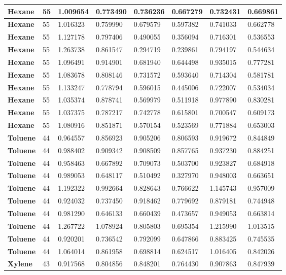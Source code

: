\documentclass{amsart}
\begin{document}
\begin{center}
\begin{tabular}{|l|l|l|l|l|l|l|l|}
\textbf{Hexane}& 55&1.009654&0.773490&0.736236&0.667279&0.732431&0.669861 \\ \hline 
\textbf{Hexane}& 55&1.016323&0.759990&0.679579&0.597382&0.741033&0.662778 \\ \hline 
\textbf{Hexane}& 55&1.127178&0.797406&0.490055&0.356094&0.716301&0.536553 \\ \hline 
\textbf{Hexane}& 55&1.263738&0.861547&0.294719&0.239861&0.794197&0.544634 \\ \hline 
\textbf{Hexane}& 55&1.096491&0.914901&0.681940&0.644498&0.935015&0.777281 \\ \hline 
\textbf{Hexane}& 55&1.083678&0.808146&0.731572&0.593640&0.714304&0.581781 \\ \hline 
\textbf{Hexane}& 55&1.133247&0.778794&0.596015&0.445006&0.722007&0.534034 \\ \hline 
\textbf{Hexane}& 55&1.035374&0.878741&0.569979&0.511918&0.977890&0.830281 \\ \hline 
\textbf{Hexane}& 55&1.037375&0.787217&0.742778&0.615801&0.700547&0.609173 \\ \hline 
\textbf{Hexane}& 55&1.080916&0.851871&0.570154&0.523569&0.771884&0.653003 \\ \hline 
\textbf{Toluene}& 44&0.964557&0.856923&0.905206&0.806593&0.919672&0.844849 \\ \hline 
\textbf{Toluene}& 44&0.988402&0.909342&0.908509&0.857765&0.937230&0.884251 \\ \hline 
\textbf{Toluene}& 44&0.958463&0.667892&0.709073&0.503700&0.923827&0.684918 \\ \hline 
\textbf{Toluene}& 44&0.989053&0.648117&0.510492&0.327970&0.948003&0.663651 \\ \hline 
\textbf{Toluene}& 44&1.192322&0.992664&0.828643&0.766622&1.145743&0.957009 \\ \hline 
\textbf{Toluene}& 44&0.924032&0.737450&0.918462&0.779692&0.879181&0.744948 \\ \hline 
\textbf{Toluene}& 44&0.981290&0.646133&0.660439&0.473657&0.949053&0.663814 \\ \hline 
\textbf{Toluene}& 44&1.267722&1.078924&0.805803&0.695354&1.215990&1.013515 \\ \hline 
\textbf{Toluene}& 44&0.920201&0.736542&0.792099&0.647866&0.883425&0.745535 \\ \hline 
\textbf{Toluene}& 44&1.064014&0.861958&0.698814&0.624517&1.016405&0.842026 \\ \hline 
\textbf{Xylene}& 43&0.917568&0.804856&0.848201&0.764430&0.907863&0.847939 \\ \hline 

\end{tabular}
\end{center}
\end{document}
